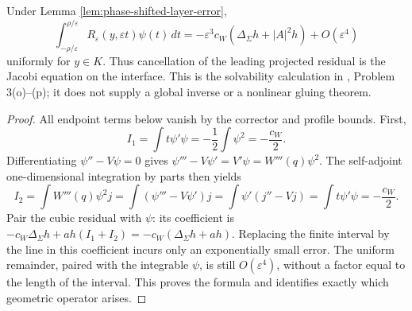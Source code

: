\begin{proposition}\label{prop:phase-jacobi-obstruction}
Under Lemma \ref{lem:phase-shifted-layer-error},
\[
 \int_{-\rho/\varepsilon}^{\rho/\varepsilon}
 R_\varepsilon(y,\varepsilon t)\psi(t)\,dt
 =-\varepsilon^3c_W(\Delta_\Sigma h+|A|^2h)+O(\varepsilon^4)
\]
uniformly for $y\in K$. Thus cancellation of the leading projected residual is the Jacobi equation on the interface. This is the solvability calculation in \cite{ChAC}, Problem 3(o)--(p); it does not supply a global inverse or a nonlinear gluing theorem.
\end{proposition}
\begin{proof}
All endpoint terms below vanish by the corrector and profile bounds. First,
\[
 I_1=\int t\psi'\psi=-\frac12\int\psi^2=-\frac{c_W}{2}.
\]
Differentiating $\psi''-V\psi=0$ gives
$\psi'''-V\psi'=V'\psi=W'''(q)\psi^2$.
The self-adjoint one-dimensional integration by parts then yields
\[
 I_2=\int W'''(q)\psi^2j
 =\int(\psi'''-V\psi')j
 =\int\psi'(j''-Vj)=\int t\psi'\psi=-\frac{c_W}{2}.
\]
Pair the cubic residual with $\psi$: its coefficient is
$-c_W\Delta_\Sigma h+ah(I_1+I_2)=-c_W(\Delta_\Sigma h+ah)$.
Replacing the finite interval by the line in this coefficient incurs only an exponentially small error. The uniform remainder, paired with the integrable $\psi$, is still $O(\varepsilon^4)$, without a factor equal to the length of the interval. This proves the formula and identifies exactly which geometric operator arises.
\end{proof}
